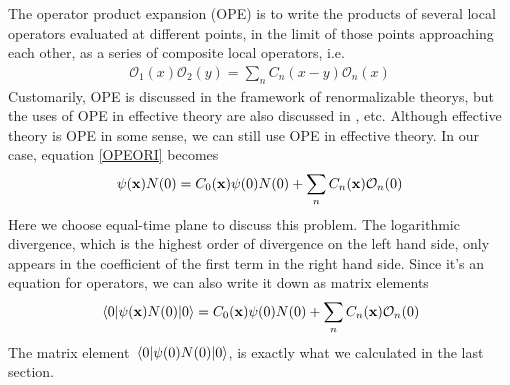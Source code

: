 \documentclass[aps,prd,preprint,showkeys,10pt]{revtex4-1}
\begin{document}
The operator product expansion\cite{Collins1984} (OPE) is to write the products of several local operators evaluated at different points, in the limit of those points approaching each other, as a series of composite local operators, i.e.
\begin{align}
	\mathcal{O}_1(x)\mathcal{O}_2(y)=\sum_nC_n(x-y)\mathcal{O}_n(x)\label{OPEORI}
\end{align}
Customarily, OPE is discussed in the framework of renormalizable theorys, but the uses of OPE in effective theory are also discussed in \cite{Broadhurst1992,Mannel1994,Kawamura2009,Kawamura2009a}, etc. Although effective theory is OPE in some sense, we can still use OPE in effective theory. In our case, equation \eqref{OPEORI} becomes
\begin{align}
	\psi(\vb{x})N(0)=C_0(\vb{x})\psi(0)N(0)+\sum_nC_n(\vb{x})\mathcal{O}_n(0)\label{OPE}
\end{align}
Here we choose equal-time plane to discuss this problem. The logarithmic divergence, which is the highest order of divergence on the left hand side, only appears in the coefficient of the first term in the right hand side. Since it's an equation for operators, we can also write it down as matrix elements
\begin{align}
	\mel{0}{\psi(\vb{x})N(0)}{0}=C_0(\vb{x})\psi(0)N(0)+\sum_nC_n(\vb{x})\mathcal{O}_n(0)\label{OPEME}
\end{align}
The matrix element $\mel{0}{\psi(0)N(0)}{0}$, is exactly what we calculated in the last section. 
\end{document}
